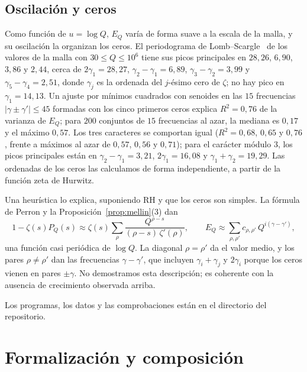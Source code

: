 \documentclass[11pt,a4paper]{amsart}
\theoremstyle{definition}
\theoremstyle{remark}
\begin{document}
\subsection*{Oscilaci\'on y ceros}
Como funci\'on de $u=\log Q$, $E_Q$ var\'ia de forma suave a la escala de la malla, y su oscilaci\'on la organizan los ceros. El periodograma de Lomb--Scargle~\cite{Lomb,Scargle} de los valores de la malla con $30\le Q\le10^6$ tiene sus picos principales en $28{,}26$, $6{,}90$, $3{,}86$ y $2{,}44$, cerca de $2\gamma_1=28{,}27$, $\gamma_2-\gamma_1=6{,}89$, $\gamma_3-\gamma_2=3{,}99$ y $\gamma_5-\gamma_4=2{,}51$, donde $\gamma_j$ es la ordenada del $j$-\'esimo cero de $\zeta$; no hay pico en $\gamma_1=14{,}13$. Un ajuste por m\'inimos cuadrados con senoides en las $15$ frecuencias $|\gamma\pm\gamma'|\le45$ formadas con los cinco primeros ceros explica $R^2=0{,}76$ de la varianza de $E_Q$; para $200$ conjuntos de $15$ frecuencias al azar, la mediana es $0{,}17$ y el m\'aximo $0{,}57$. Los tres caracteres se comportan igual ($R^2=0{,}68$, $0{,}65$ y $0{,}76$, frente a m\'aximos al azar de $0{,}57$, $0{,}56$ y $0{,}71$); para el car\'acter m\'odulo $3$, los picos principales est\'an en $\gamma_2-\gamma_1=3{,}21$, $2\gamma_1=16{,}08$ y $\gamma_1+\gamma_2=19{,}29$. Las ordenadas de los ceros las calculamos de forma independiente, a partir de la funci\'on zeta de Hurwitz.

Una heur\'istica lo explica, suponiendo RH y que los ceros son simples. La f\'ormula de Perron y la Proposici\'on~\ref{prop:mellin}(3) dan
\[
1-\zeta(s)P_Q(s)\approx\zeta(s)\sum_\rho\frac{Q^{\rho-s}}{(\rho-s)\,\zeta'(\rho)},\qquad
E_Q\approx\sum_{\rho,\rho'}c_{\rho,\rho'}\,Q^{i(\gamma-\gamma')},
\]
una funci\'on casi peri\'odica de $\log Q$. La diagonal $\rho=\rho'$ da el valor medio, y los pares $\rho\ne\rho'$ dan las frecuencias $\gamma-\gamma'$, que incluyen $\gamma_i+\gamma_j$ y $2\gamma_i$ porque los ceros vienen en pares $\pm\gamma$. No demostramos esta descripci\'on; es coherente con la ausencia de crecimiento observada arriba.

Los programas, los datos y las comprobaciones est\'an en el directorio  del repositorio.

\section{Formalizaci\'on y composici\'on}\label{sec:formal}
\end{document}
